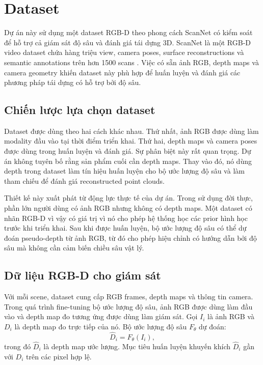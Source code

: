 \documentclass[12pt,a4paper]{article}
\begin{document}
\section{Dataset}
Dự án này sử dụng một dataset RGB-D theo phong cách ScanNet có kiểm soát để hỗ trợ cả giám sát độ sâu và đánh giá tái dựng 3D. ScanNet là một RGB-D video dataset chứa hàng triệu view, camera poses, surface reconstructions và semantic annotations trên hơn 1500 scans \cite{scannet}. Việc có sẵn ảnh RGB, depth maps và camera geometry khiến dataset này phù hợp để huấn luyện và đánh giá các phương pháp tái dựng có hỗ trợ bởi độ sâu.

\subsection{Chiến lược lựa chọn dataset}
Dataset được dùng theo hai cách khác nhau. Thứ nhất, ảnh RGB được dùng làm modality đầu vào tại thời điểm triển khai. Thứ hai, depth maps và camera poses được dùng trong huấn luyện và đánh giá. Sự phân biệt này rất quan trọng. Dự án không tuyên bố rằng sản phẩm cuối cần depth maps. Thay vào đó, nó dùng depth trong dataset làm tín hiệu huấn luyện cho bộ ước lượng độ sâu và làm tham chiếu để đánh giá reconstructed point clouds.

Thiết kế này xuất phát từ động lực thực tế của dự án. Trong sử dụng đời thực, phần lớn người dùng có ảnh RGB nhưng không có depth maps. Một dataset có nhãn RGB-D vì vậy có giá trị vì nó cho phép hệ thống học các prior hình học trước khi triển khai. Sau khi được huấn luyện, bộ ước lượng độ sâu có thể dự đoán pseudo-depth từ ảnh RGB, từ đó cho phép hiệu chỉnh có hướng dẫn bởi độ sâu mà không cần cảm biến chiều sâu vật lý.

\subsection{Dữ liệu RGB-D cho giám sát}
Với mỗi scene, dataset cung cấp RGB frames, depth maps và thông tin camera. Trong quá trình fine-tuning bộ ước lượng độ sâu, ảnh RGB được dùng làm đầu vào và depth map đo tương ứng được dùng làm giám sát. Gọi $I_i$ là ảnh RGB và $D_i$ là depth map đo trực tiếp của nó. Bộ ước lượng độ sâu $F_\theta$ dự đoán:
\begin{equation}
\hat{D}_i = F_\theta(I_i),
\end{equation}
trong đó $\hat{D}_i$ là depth map ước lượng. Mục tiêu huấn luyện khuyến khích $\hat{D}_i$ gần với $D_i$ trên các pixel hợp lệ.
\end{document}
